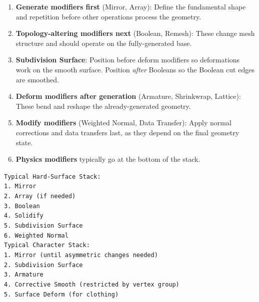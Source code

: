 \begin{enumerate}[leftmargin=2em]
  \item \textbf{Generate modifiers first} (Mirror, Array): Define the fundamental shape and repetition before other operations process the geometry.
  \item \textbf{Topology-altering modifiers next} (Boolean, Remesh): These change mesh structure and should operate on the fully-generated base.
  \item \textbf{Subdivision Surface}: Position before deform modifiers so deformations work on the smooth surface. Position \textit{after} Booleans so the Boolean cut edges are smoothed.
  \item \textbf{Deform modifiers after generation} (Armature, Shrinkwrap, Lattice): These bend and reshape the already-generated geometry.
  \item \textbf{Modify modifiers} (Weighted Normal, Data Transfer): Apply normal corrections and data transfers last, as they depend on the final geometry state.
  \item \textbf{Physics modifiers} typically go at the bottom of the stack.
\end{enumerate}

\begin{codebox}
\texttt{Typical Hard-Surface Stack:}\\[0.3em]
\texttt{1. Mirror}\\
\texttt{2. Array (if needed)}\\
\texttt{3. Boolean}\\
\texttt{4. Solidify}\\
\texttt{5. Subdivision Surface}\\
\texttt{6. Weighted Normal}\\[0.6em]
\texttt{Typical Character Stack:}\\[0.3em]
\texttt{1. Mirror (until asymmetric changes needed)}\\
\texttt{2. Subdivision Surface}\\
\texttt{3. Armature}\\
\texttt{4. Corrective Smooth (restricted by vertex group)}\\
\texttt{5. Surface Deform (for clothing)}\\
\end{codebox}



